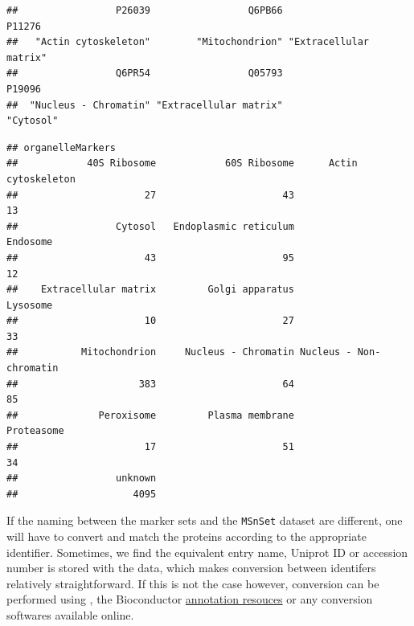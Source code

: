 \begin{knitrout}
\color{fgcolor}\begin{kframe}
\begin{alltt}
 \hlkwb{<-} \hlstd{(} \hlstd{=} \hlstd{)}
\end{alltt}
\begin{verbatim}
##                 P26039                 Q6PB66                 P11276 
##   "Actin cytoskeleton"        "Mitochondrion" "Extracellular matrix" 
##                 Q6PR54                 Q05793                 P19096 
##  "Nucleus - Chromatin" "Extracellular matrix"              "Cytosol"
\end{verbatim}
\begin{alltt}
 \hlkwb{<-} 
\end{alltt}


{\ttfamily\noindent\itshape\color{messagecolor}{\#\# Markers in data: 937 out of 5032}}\begin{verbatim}
## organelleMarkers
##            40S Ribosome            60S Ribosome      Actin cytoskeleton 
##                      27                      43                      13 
##                 Cytosol   Endoplasmic reticulum                Endosome 
##                      43                      95                      12 
##    Extracellular matrix         Golgi apparatus                Lysosome 
##                      10                      27                      33 
##           Mitochondrion     Nucleus - Chromatin Nucleus - Non-chromatin 
##                     383                      64                      85 
##              Peroxisome         Plasma membrane              Proteasome 
##                      17                      51                      34 
##                 unknown 
##                    4095
\end{verbatim}
\end{kframe}
\end{knitrout}

If the naming between the marker sets and the \texttt{MSnSet} dataset
are different, one will have to convert and match the proteins
according to the appropriate identifier. Sometimes, we find the
equivalent entry name, Uniprot ID or accession number is stored with
the data, which makes conversion between identifers relatively
straightforward. If this is not the case however, conversion can be
performed using , the Bioconductor
\href{http://bioconductor.org/help/workflows/annotation/Annotation_Resources/}{annotation
  resouces} or any conversion softwares available online.

